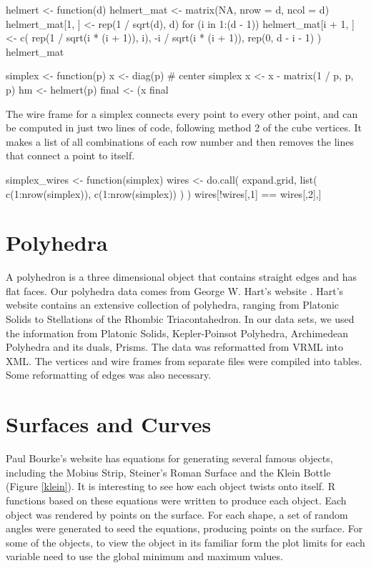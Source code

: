 \begin{example}
helmert <- function(d) {
  helmert_mat <- matrix(NA, nrow = d, ncol = d)
  helmert_mat[1, ] <- rep(1 / sqrt(d), d)
  for (i in 1:(d - 1)) {
    helmert_mat[i + 1, ] <- c(
      rep(1 / sqrt(i * (i + 1)), i),
      -i / sqrt(i * (i + 1)),
      rep(0, d - i - 1)
    )
  }
  helmert_mat
}

simplex <- function(p) {
  x <- diag(p)
  # center simplex
  x <- x - matrix(1 / p, p, p)
  hm <- helmert(p)
  final <- (x %
  final
}
\end{example}

The wire frame for a simplex connects every point to every other point, and can
be computed in just two lines of code, following method 2 of the cube
vertices. It makes a list of all combinations of each row number and then
removes the lines that connect a point to itself.

\begin{example}
simplex_wires <- function(simplex) {
  wires <- do.call(
    expand.grid,
    list(
      c(1:nrow(simplex)),
      c(1:nrow(simplex))
    )
  )
  wires[!wires[,1] == wires[,2],]
}
\end{example}

\section{Polyhedra}

A polyhedron is a three dimensional object that contains straight
edges and has flat faces. Our polyhedra data comes from George
W. Hart's website \citep{GeorgeVP}. Hart's website contains an
extensive collection of polyhedra, ranging from Platonic Solids to
Stellations of the Rhombic Triacontahedron. In our data sets, we used
the information from Platonic Solids, Kepler-Poinsot Polyhedra,
Archimedean Polyhedra and its duals, Prisms. The data was reformatted
from VRML into XML. The vertices and wire frames from separate
files were compiled into tables. Some reformatting of edges was also
necessary.

\section{Surfaces and Curves}

Paul Bourke's website \citep{PBCurves} has equations for generating
several famous objects, including the Mobius Strip, Steiner's Roman
Surface and the Klein Bottle (Figure \ref{klein}). It is interesting to see how each object
twists onto itself.  R functions based on these equations were written
to produce each object.  Each object was rendered by points on the
surface. For each shape, a set of random angles were generated to seed
the equations, producing points on the surface.  For some of the
objects, to view the object in its familiar form the plot limits for each
variable need to use the global minimum and maximum values.

